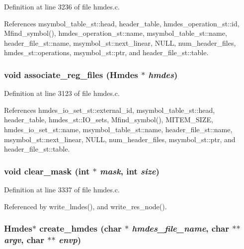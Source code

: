 Definition at line 3236 of file hmdes.c.

References msymbol\_\-table\_\-st::head, header\_\-table, hmdes\_\-operation\_\-st::id, Mfind\_\-symbol(), hmdes\_\-operation\_\-st::name, msymbol\_\-table\_\-st::name, header\_\-file\_\-st::name, msymbol\_\-st::next\_\-linear, NULL, num\_\-header\_\-files, hmdes\_\-st::operations, msymbol\_\-st::ptr, and header\_\-file\_\-st::table.
\subsubsection{\setlength{\rightskip}{0pt plus 5cm}void associate\_\-reg\_\-files (\bf{Hmdes} $\ast$ {\em hmdes})}\label{hmdes_8c_d97bc6015f7945e01a4eede7f79ae0d1}




Definition at line 3123 of file hmdes.c.

References hmdes\_\-io\_\-set\_\-st::external\_\-id, msymbol\_\-table\_\-st::head, header\_\-table, hmdes\_\-st::IO\_\-sets, Mfind\_\-symbol(), MITEM\_\-SIZE, hmdes\_\-io\_\-set\_\-st::name, msymbol\_\-table\_\-st::name, header\_\-file\_\-st::name, msymbol\_\-st::next\_\-linear, NULL, num\_\-header\_\-files, msymbol\_\-st::ptr, and header\_\-file\_\-st::table.
\subsubsection{\setlength{\rightskip}{0pt plus 5cm}void clear\_\-mask (int $\ast$ {\em mask}, int {\em size})}\label{hmdes_8c_88f18e1a13f5f5d2b335ab3b5de0c127}




Definition at line 3337 of file hmdes.c.

Referenced by write\_\-lmdes(), and write\_\-res\_\-node().
\subsubsection{\setlength{\rightskip}{0pt plus 5cm}\bf{Hmdes}$\ast$ create\_\-hmdes (char $\ast$ {\em hmdes\_\-file\_\-name}, char $\ast$$\ast$ {\em argv}, char $\ast$$\ast$ {\em envp})}\label{hmdes_8c_3157c981faa1f80fffce64fe8a1685b2}




